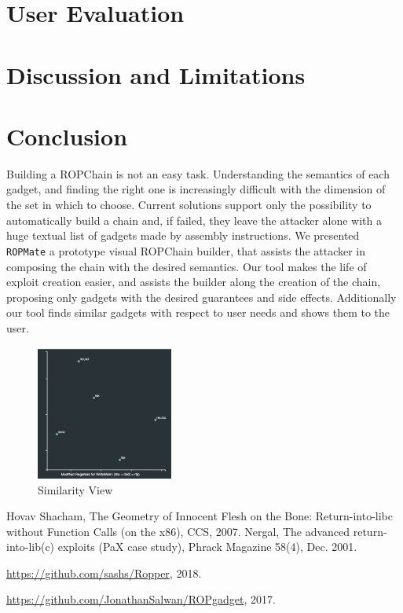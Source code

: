\documentclass[twocolumn, 11pt]{article}
\begin{document}
\section{User Evaluation}

\section{Discussion and Limitations}

\section{Conclusion}
Building a ROPChain is not an easy task. Understanding the semantics of each gadget, and finding the right one is increasingly difficult with the dimension of the set in which to choose. Current solutions support only the possibility to automatically build a chain and, if failed, they leave the attacker alone with a huge textual list of gadgets made by assembly instructions.
We presented \texttt{ROPMate} a prototype visual ROPChain builder, that assists the attacker in composing the chain with the desired semantics. Our tool makes the life of exploit creation easier, and assists the builder along the creation of the chain, proposing only gadgets with the desired guarantees and side effects. Additionally our tool finds similar gadgets with respect to user needs and shows them to the user.


\begin{figure}[htb]
\centering
 \includegraphics[width=0.4\textwidth]{mds}
 \caption{Similarity View}\label{fig:mds}
\end{figure}



\begin{thebibliography}{99}
    Hovav Shacham,
    The Geometry of Innocent Flesh on the Bone: Return-into-libc without Function Calls (on the x86),
    CCS,
    2007.
    Nergal,
    The advanced return-into-lib(c) exploits (PaX case study),
    Phrack Magazine 58(4),
    Dec. 2001.

     \url{https://github.com/sashs/Ropper},
    2018.

    \url{https://github.com/JonathanSalwan/ROPgadget},
    2017.

\end{thebibliography}
\end{document}
